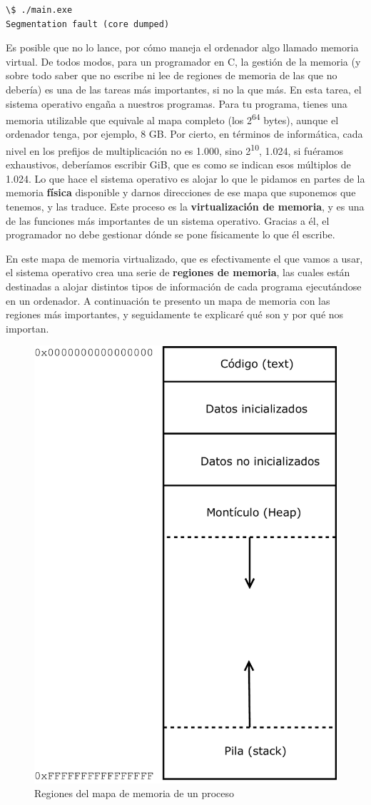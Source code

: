 \documentclass[a4paper]{article}
\begin{document}
\noindent
\begin{minipage}[H]{\linewidth}
\mbox{}
\begin{lstlisting}[style=terminalStyle]
\$ ./main.exe
Segmentation fault (core dumped)
\end{lstlisting}
\end{minipage}


Es posible que no lo lance, por cómo maneja el ordenador algo llamado
memoria virtual. De todos
modos, para un programador en C, la gestión de la memoria (y sobre todo
saber que no escribe ni lee de regiones de memoria de las que no debería) es
una de las tareas más importantes, si no la que más. En esta tarea, el sistema
operativo engaña a nuestros programas. Para tu programa, tienes una memoria
utilizable que equivale al mapa completo (los 2\textsuperscript{64} bytes),
aunque el ordenador tenga, por ejemplo, 8 GB. Por cierto, en términos
de informática, cada nivel en los prefijos de multiplicación no es 1.000,
sino 2\textsuperscript{10}, 1.024, si fuéramos
exhaustivos, deberíamos escribir GiB, que es como se indican
esos múltiplos de 1.024. Lo que hace el sistema operativo es
alojar lo que le pidamos en partes de la memoria \textbf{física} disponible
y darnos direcciones de ese mapa que suponemos que tenemos, y las traduce.
Este proceso es la \textbf{virtualización de memoria}, y es una de las
funciones más importantes de un sistema operativo. Gracias a él, el programador
no debe gestionar dónde se pone físicamente lo que él escribe.

En este mapa de memoria virtualizado, que es efectivamente el que vamos a usar,
el sistema operativo crea una serie de \textbf{regiones de memoria}, las cuales
están destinadas a alojar distintos tipos de información de cada programa
ejecutándose en un ordenador. A continuación te presento un mapa de memoria
con las regiones más importantes, y seguidamente te explicaré qué son y por qué
nos importan.
\begin{figure}[H]
    \center
    \includegraphics[width=0.5\linewidth]{regionsMemoryMap}
    \caption{Regiones del mapa de memoria de un proceso}
    \label{img:regionsMemoryMap}
\end{figure}
\end{document}

